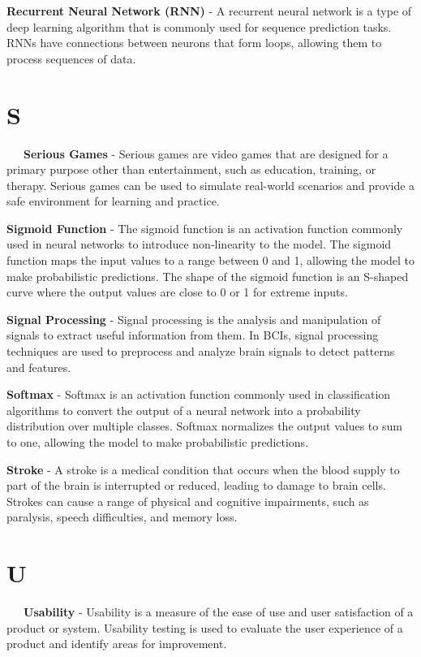 \textbf{Recurrent Neural Network (RNN)} - A recurrent neural network is a type of deep learning algorithm that is commonly used for sequence prediction tasks. RNNs have connections between neurons that form loops, allowing them to process sequences of data.

\section*{S}

\-\ \-\ \-\ \textbf{Serious Games} - Serious games are video games that are designed for a primary purpose other than entertainment, such as education, training, or therapy. Serious games can be used to simulate real-world scenarios and provide a safe environment for learning and practice.

\textbf{Sigmoid Function} - The sigmoid function is an activation function commonly used in neural networks to introduce non-linearity to the model. The sigmoid function maps the input values to a range between 0 and 1, allowing the model to make probabilistic predictions. The shape of the sigmoid function is an S-shaped curve where the output values are close to 0 or 1 for extreme inputs.

\textbf{Signal Processing} - Signal processing is the analysis and manipulation of signals to extract useful information from them. In BCIs, signal processing techniques are used to preprocess and analyze brain signals to detect patterns and features.

\textbf{Softmax} - Softmax is an activation function commonly used in classification algorithms to convert the output of a neural network into a probability distribution over multiple classes. Softmax normalizes the output values to sum to one, allowing the model to make probabilistic predictions.

\textbf{Stroke} - A stroke is a medical condition that occurs when the blood supply to part of the brain is interrupted or reduced, leading to damage to brain cells. Strokes can cause a range of physical and cognitive impairments, such as paralysis, speech difficulties, and memory loss.

\section*{U}

\-\ \-\ \-\ \textbf{Usability} - Usability is a measure of the ease of use and user satisfaction of a product or system. Usability testing is used to evaluate the user experience of a product and identify areas for improvement.

